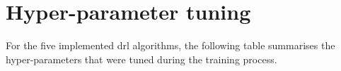 \chapter{Hyper-parameter tuning} \label{app:hyperparameter_tuning}

For the five implemented \acrlong{drl} algorithms, the following table summarises the hyper-parameters that were tuned during the training process.



